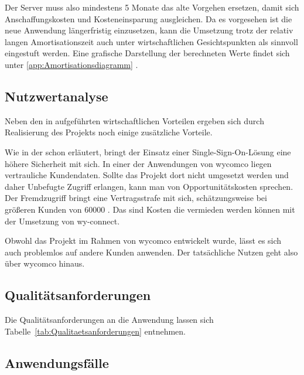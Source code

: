 Der Server muss also mindestens 5 Monate das alte Vorgehen ersetzen,
damit sich Anschaffungskosten und Kosteneinsparung ausgleichen. Da es vorgesehen ist die
neue Anwendung längerfristig einzusetzen, kann die Umsetzung trotz der relativ langen
Amortisationszeit auch unter wirtschaftlichen Gesichtspunkten als sinnvoll eingestuft werden.
Eine grafische Darstellung der berechneten Werte findet sich unter \ref{app:Amortisationsdiagramm} .


\subsection{Nutzwertanalyse}
\label{sec:Nutzwertanalyse}

Neben den in  aufgeführten wirtschaftlichen Vorteilen ergeben sich durch Realisierung des Projekts noch einige zusätzliche Vorteile.

Wie in der  schon erläutert, bringt der Einsatz einer Single-Sign-On-Lösung eine höhere Sicherheit mit sich.
In einer der Anwendungen von wycomco liegen vertrauliche Kundendaten. Sollte das Projekt dort nicht umgesetzt werden und daher Unbefugte Zugriff erlangen, kann man von Opportunitätskosten sprechen. Der Fremdzugriff bringt eine Vertragsstrafe mit sich, schätzungsweise bei größeren Kunden von 60000 \eur. Das sind Kosten die vermieden werden können mit der Umsetzung von wy-connect. 

Obwohl das Projekt im Rahmen von wycomco entwickelt wurde, lässt es sich auch problemlos auf andere Kunden anwenden. Der tatsächliche Nutzen geht also über wycomco hinaus.


\subsection{Qualitätsanforderungen}
\label{sec:Qualitaetsanforderungen}

Die Qualitätsanforderungen an die Anwendung lassen sich Tabelle~\ref{tab:Qualitaetsanforderungen} entnehmen.


\subsection{Anwendungsfälle}
\label{sec:Anwendungsfaelle}

